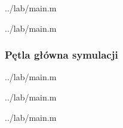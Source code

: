
    {../lab/main.m}


    {../lab/main.m}
\newpage


\subsubsection{Pętla główna symulacji}


    {../lab/main.m}


    {../lab/main.m}


    {../lab/main.m}
\newpage
